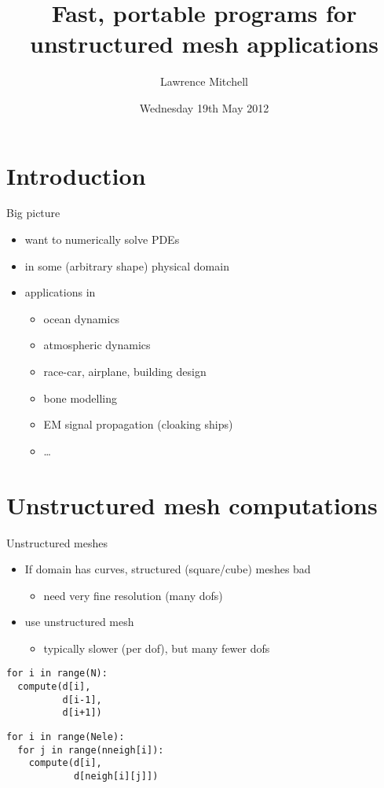 \documentclass[bigger]{beamer}
\institute{EPCC, The University of Edinburgh}
\author{Lawrence Mitchell}
\date{Wednesday 19th May 2012}
\title{Fast, portable programs for unstructured mesh applications}
\begin{document}
\begin{frame}
\maketitle
\end{frame}


\section{Introduction}
\label{sec:orgheadline2}


\begin{frame}[label={sec:orgheadline1}]{Big picture}
\begin{itemize}
\item want to numerically solve PDEs
\item in some (arbitrary shape) physical domain
\item applications in
\begin{itemize}
\item ocean dynamics
\item atmospheric dynamics
\item race-car, airplane, building design
\item bone modelling
\item EM signal propagation (cloaking ships)
\item \ldots{}
\end{itemize}
\end{itemize}
\end{frame}

\section{Unstructured mesh computations}
\label{sec:orgheadline4}
\begin{frame}[fragile,label={sec:orgheadline3}]{Unstructured meshes}
 \begin{itemize}
\item If domain has curves, structured (square/cube) meshes bad
\begin{itemize}
\item need very fine resolution (many dofs)
\end{itemize}
\item use unstructured mesh
\begin{itemize}
\item typically slower (per dof), but many fewer dofs
\end{itemize}
\end{itemize}

\begin{verbatim}
for i in range(N):
  compute(d[i], 
          d[i-1],
          d[i+1])
\end{verbatim}

\begin{verbatim}
for i in range(Nele):
  for j in range(nneigh[i]):
    compute(d[i],
            d[neigh[i][j]])
\end{verbatim}
\end{frame}
\end{document}
